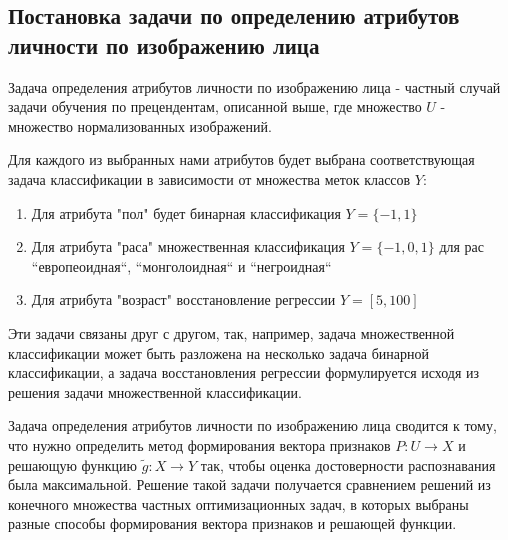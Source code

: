 \documentclass[12pt,a4paper]{article}
\begin{document}
\subsection{Постановка задачи по определению атрибутов личности по изображению лица}
Задача определения атрибутов личности по изображению лица - частный случай задачи обучения по прецендентам, описанной выше, где множество $U$ - множество нормализованных изображений.

Для каждого из выбранных нами атрибутов будет выбрана соответствующая задача классификации в зависимости от множества меток классов $Y$:
\begin{enumerate}
    \item Для атрибута "пол" будет бинарная классификация $Y = \{-1 , 1\}$
    \item Для атрибута "раса" множественная классификация $Y = \{-1, 0, 1\}$ для рас ``европеоидная``, ``монголоидная`` и ``негроидная``
    \item Для атрибута "возраст" восстановление регрессии $Y = [5, 100]$
\end{enumerate}

Эти задачи связаны друг с другом, так, например, задача множественной классификации может быть разложена на несколько задача бинарной классификации, а задача восстановления регрессии формулируется исходя из решения задачи множественной классификации.

Задача определения атрибутов личности по изображению лица сводится к тому, что нужно определить метод формирования вектора признаков $P: U \longrightarrow X$ и решающую функцию $\tilde{g}: X \longrightarrow Y$ так, чтобы оценка достоверности распознавания была максимальной. Решение такой задачи получается сравнением решений из конечного множества частных оптимизационных задач, в которых выбраны разные способы формирования вектора признаков и решающей функции.
\end{document}
